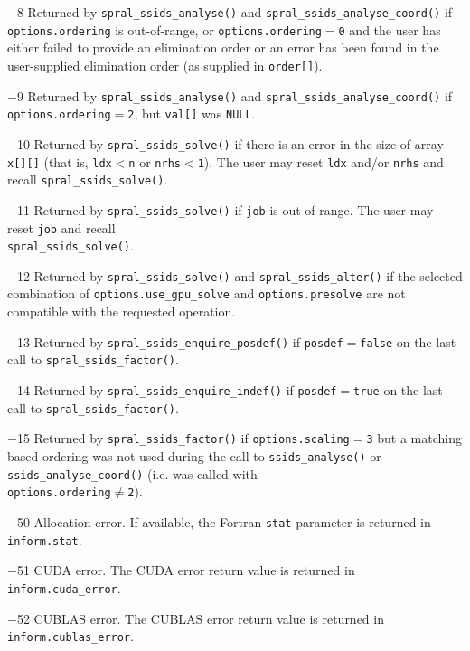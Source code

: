 \begin{description}
\item{$-$8} Returned by {\tt spral\_ssids\_analyse()}  and
            {\tt spral\_ssids\_analyse\_coord()} if {\tt options.ordering} is
            out-of-range, or {\tt options.ordering}$=${\tt 0} and the user
            has either failed to provide an elimination order or an error has
            been found in the user-supplied elimination order (as supplied in
            {\tt order[]}).
\item{$-$9} Returned by {\tt spral\_ssids\_analyse()} and
            {\tt spral\_ssids\_analyse\_coord()} if {\tt options.ordering}$=${\tt 2},
            but {\tt val[]} was \texttt{NULL}.
\item{$-$10} Returned by {\tt spral\_ssids\_solve()} if there is an error in the size
            of array {\tt x[][]} (that is, {\tt ldx$<$n} or {\tt nrhs$<$1}).
            The user may reset {\tt ldx} and/or {\tt nrhs} and recall
            {\tt spral\_ssids\_solve()}.
\item{$-$11} Returned by {\tt spral\_ssids\_solve()} if {\tt job} is out-of-range.
            The user may reset {\tt job} and recall \\
            {\tt spral\_ssids\_solve()}.
\item{$-$12} Returned by {\tt spral\_ssids\_solve()} and
            {\tt spral\_ssids\_alter()} if the selected combination of
            {\tt options.use\_gpu\_solve} and {\tt options.presolve} are not
            compatible with the requested operation.
\item{$-$13} Returned by {\tt spral\_ssids\_enquire\_posdef()} if
            {\tt posdef}$=${\tt false} on the last call
            to {\tt spral\_ssids\_factor()}.
\item{$-$14} Returned by {\tt spral\_ssids\_enquire\_indef()} if
            {\tt posdef}$=${\tt true} on the last call to
            {\tt spral\_ssids\_factor()}.
\item{$-$15} Returned by {\tt spral\_ssids\_factor()} if {\tt options.scaling$=$3}
            but a matching based ordering was not used during the call to
            {\tt ssids\_analyse()} or {\tt ssids\_analyse\_coord()} (i.e. was
            called with \\
            {\tt options.ordering}$\ne${\tt 2}).
\item{$-$50} Allocation error. If available, the Fortran {\tt stat}
            parameter is returned in {\tt inform.stat}.
\item{$-$51} CUDA error. The CUDA error return value is returned in
            {\tt inform.cuda\_error}.
\item{$-$52} CUBLAS error. The CUBLAS error return value is returned in
            {\tt inform.cublas\_error}.
\end{description}
